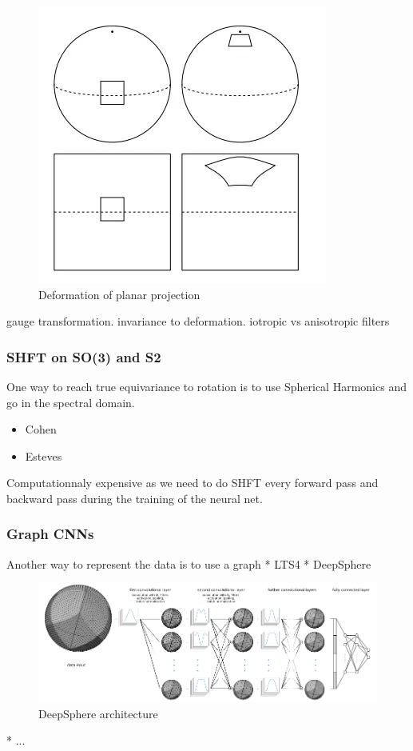 \documentclass[11pt]{report}
\begin{document}
\begin{figure}[h!]
    \centering
    \includegraphics[width=0.5\linewidth]{v2-9d6a9d92bb02bc9e198c4c16397ce2fd_b.jpg}
    \caption{Deformation of planar projection \cite{cohen_spherical_2018}}
    \label{fig:planar_projection}
\end{figure}

gauge transformation. invariance to deformation. iotropic vs anisotropic filters
\subsubsection{SHFT on SO(3) and S2}
One way to reach true equivariance to rotation is to use Spherical Harmonics and go in the spectral domain.
\begin{itemize}
    \item Cohen \cite{cohen_spherical_2018}
    \item Esteves \cite{esteves_learning_2017}
\end{itemize}
Computationnaly expensive as we need to do SHFT every forward pass and backward pass during the training of the neural net.
\subsubsection{Graph CNNs}
Another way to represent the data is to use a graph
* LTS4 \cite{frossard_graph-based_2017}
* DeepSphere \cite{perraudin_deepsphere:_2018}
\begin{figure}[h!]
    \centering
    \includegraphics[width=0.8\linewidth]{figure2-Blogpost-SCNN.png}
    \caption{DeepSphere architecture}
    \label{fig:deepsphere}
\end{figure}
* ...
\end{document}
